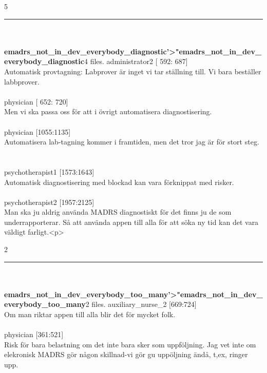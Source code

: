 \documentclass[12pt,a4paper,oneside]{article}
\begin{document}
5 
\hrule
\ \\\ \\{\bf emadrs\_not\_in\_dev\_everybody\_diagnostic'>"emadrs\_not\_in\_dev\_everybody\_diagnostic}4 files.
 administrator2 [ 592: 687]\\ 
Automatisk provtagning: Labprover {\"a}r inget vi tar st{\"a}llning till. Vi bara best{\"a}ller labbprover. %
\ \\\ \\
 physician [ 652: 720]\\ 
Men vi ska passa oss f{\"o}r att i {\"o}vrigt automatisera diagnostisering.  %
\ \\\ \\
 physician [1055:1135]\\ 
Automatisera lab-tagning kommer i framtiden, men det tror jag {\"a}r f{\"o}r stort steg. %
\ \\\ \\
 psychotherapist1 [1573:1643]\\ 
Automatisk diagnostisering med blockad kan vara f{\"o}rknippat med risker. %
\ \\\ \\
 psychotherapist2 [1957:2125]\\ 
Man ska ju aldrig anv{\"a}nda MADRS diagnostiskt f{\"o}r det finns ju de som underrapporterar. S{\aa} att anv{\"a}nda appen till alla f{\"o}r att s{\"o}ka ny tid kan det vara v{\"a}ldigt farligt.<p> %

2 
\hrule
\ \\\ \\{\bf emadrs\_not\_in\_dev\_everybody\_too\_many'>"emadrs\_not\_in\_dev\_everybody\_too\_many}2 files.
 auxiliary\_nurse\_2 [669:724]\\ 
Om man riktar appen till alla blir det f{\"o}r mycket folk. %
\ \\\ \\
 physician [361:521]\\ 
Risk f{\"o}r bara belastning om det inte bara sker som uppf{\"o}ljning. Jag vet inte om elekronisk MADRS g{\"o}r n{\aa}gon skillnad-vi g{\"o}r gu upp{\"o}ljning {\"a}nd{\aa}, t,ex, ringer upp. %
\end{document}
